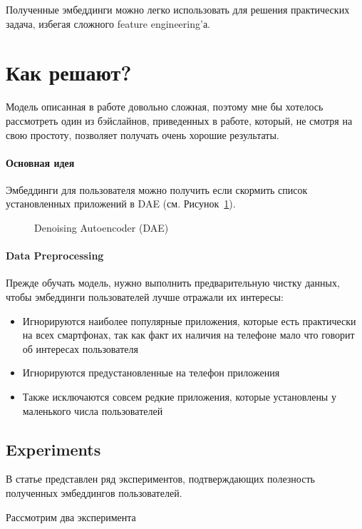 Полученные эмбеддинги можно легко использовать для решения практических задача, избегая сложного feature engineering'а.

\section*{Как решают?}

Модель описанная в работе довольно сложная, поэтому мне бы хотелось рассмотреть один из бэйслайнов, приведенных в работе, который, не смотря на свою простоту, позволяет получать очень хорошие результаты.

\paragraph{Основная идея} Эмбеддинги для пользователя можно получить если скормить список установленных приложений в DAE (см. Рисунок~\ref{fig:dae}).

\begin{figure}[ht]
    \centering
    
    \caption{\footnotesize{Denoising Autoencoder (DAE)}}
    \label{fig:dae}
\end{figure}

\paragraph{Data Preprocessing} Прежде обучать модель, нужно выполнить предварительную чистку данных, чтобы эмбеддинги пользователей лучше отражали их интересы:
\begin{itemize}
    \item Игнорируются наиболее популярные приложения, которые есть практически на всех смартфонах, так как факт их наличия на телефоне мало что говорит об интересах пользователя
    \item Игнорируются предустановленные на телефон приложения
    \item Также исключаются совсем редкие приложения, которые установлены у маленького числа пользователей
\end{itemize}

\subsection*{Experiments}

В статье представлен ряд экспериментов, подтверждающих полезность полученных эмбеддингов пользователей.

Рассмотрим два эксперимента

